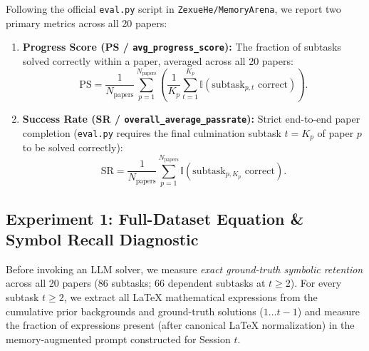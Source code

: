 \documentclass[11pt,a4paper]{article}
\begin{document}
Following the official \texttt{eval.py} script in \texttt{ZexueHe/MemoryArena}, we report two primary metrics across all 20 papers:
\begin{enumerate}[leftmargin=1.5em,itemsep=1pt]
    \item \textbf{Progress Score (PS / \texttt{avg\_progress\_score}):} The fraction of subtasks solved correctly within a paper, averaged across all 20 papers:
    \begin{equation}
        \text{PS} = \frac{1}{N_{\text{papers}}} \sum_{p=1}^{N_{\text{papers}}} \left( \frac{1}{K_p} \sum_{t=1}^{K_p} \mathbb{I}(\text{subtask}_{p,t}\text{ correct}) \right).
    \end{equation}
    \item \textbf{Success Rate (SR / \texttt{overall\_average\_passrate}):} Strict end-to-end paper completion (\texttt{eval.py} requires the final culmination subtask $t = K_p$ of paper $p$ to be solved correctly):
    \begin{equation}
        \text{SR} = \frac{1}{N_{\text{papers}}} \sum_{p=1}^{N_{\text{papers}}} \mathbb{I}(\text{subtask}_{p,K_p}\text{ correct}).
    \end{equation}
\end{enumerate}

\subsection{Experiment 1: Full-Dataset Equation \& Symbol Recall Diagnostic}

Before invoking an LLM solver, we measure \emph{exact ground-truth symbolic retention} across all 20 papers (86 subtasks; 66 dependent subtasks at $t \ge 2$). For every subtask $t \ge 2$, we extract all LaTeX mathematical expressions from the cumulative prior backgrounds and ground-truth solutions ($1\dots t-1$) and measure the fraction of expressions present (after canonical LaTeX normalization) in the memory-augmented prompt constructed for Session $t$.
\end{document}
